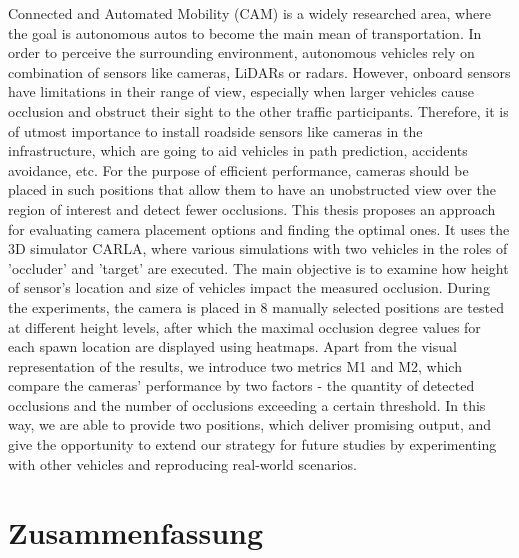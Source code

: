 Connected and Automated Mobility (CAM) is a widely researched area, where the goal is autonomous autos to become the main mean of transportation. In order to perceive the surrounding environment, autonomous vehicles rely on combination of sensors like cameras, LiDARs or radars. However, onboard sensors have limitations in their range of view, especially when larger vehicles cause occlusion and obstruct their sight to the other traffic participants. Therefore, it is of utmost importance to install roadside sensors like cameras in the infrastructure, which are going to aid vehicles in path prediction, accidents avoidance, etc. For the purpose of efficient performance, cameras should be placed in such positions that allow them to have an unobstructed view over the region of interest and detect fewer occlusions. This thesis proposes an approach for evaluating camera placement options and finding the optimal ones. It uses the 3D simulator CARLA, where various simulations with two vehicles in the roles of 'occluder' and 'target' are executed. The main objective is to examine how height of sensor's location and size of vehicles impact the measured occlusion. During the experiments, the camera is placed in 8 manually selected positions are tested at different height levels, after which the maximal occlusion degree values for each spawn location are displayed using heatmaps. Apart from the visual representation of the results, we introduce two metrics M1 and M2, which compare the cameras' performance by two factors - the quantity of detected occlusions and the number of occlusions exceeding a certain threshold. In this way, we are able to provide two positions, which deliver promising output, and give the opportunity to extend our strategy for future studies by experimenting with other vehicles and reproducing real-world scenarios.       


\newpage
\chapter*{Zusammenfassung}

